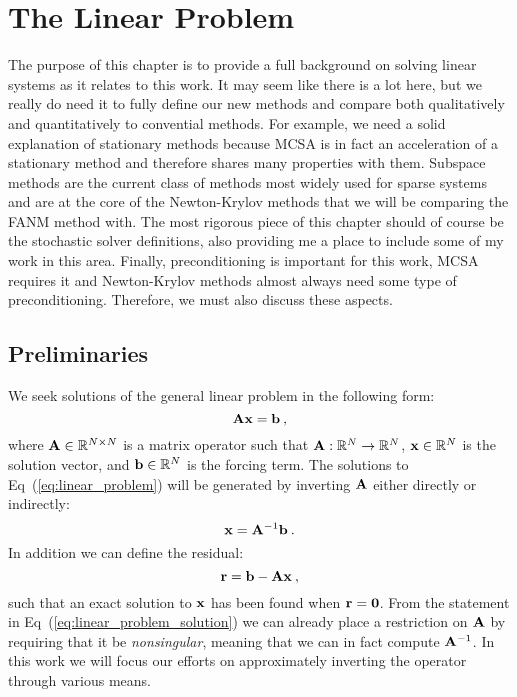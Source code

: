 \chapter{The Linear Problem}
\label{ch:linear_problem}

The purpose of this chapter is to provide a full background on solving
linear systems as it relates to this work. It may seem like there is a
lot here, but we really do need it to fully define our new methods and
compare both qualitatively and quantitatively to convential
methods. For example, we need a solid explanation of stationary
methods because MCSA is in fact an acceleration of a stationary method
and therefore shares many properties with them. Subspace methods are
the current class of methods most widely used for sparse systems and
are at the core of the Newton-Krylov methods that we will be comparing
the FANM method with. The most rigorous piece of this chapter should
of course be the stochastic solver definitions, also providing me a
place to include some of my work in this area. Finally,
preconditioning is important for this work, MCSA requires it and
Newton-Krylov methods almost always need some type of
preconditioning. Therefore, we must also discuss these aspects.

\section{Preliminaries}
\label{sec:linear_preliminaries}
We seek solutions of the general linear problem in the following form:
\begin{equation}
  \mathbf{A} \mathbf{x} = \mathbf{b}\:,
  \label{eq:linear_problem}
\end{equation}
where $\mathbf{A} \in \mathbb{R}^{N \times N}$ is a matrix operator such
that $\mathbf{A} : \mathbb{R}^{N} \rightarrow \mathbb{R}^{N}$, $\mathbf{x} \in
\mathbb{R}^N$ is the solution vector, and $\mathbf{b} \in \mathbb{R}^N$ is
the forcing term. The solutions to Eq~(\ref{eq:linear_problem}) will
be generated by inverting $\mathbf{A}$ either directly or indirectly:
\begin{equation}
  \mathbf{x} = \mathbf{A}^{-1} \mathbf{b}
  \label{eq:linear_problem_solution}\:.
\end{equation}
In addition we can define the residual:
\begin{equation}
  \mathbf{r} = \mathbf{b} - \mathbf{A}\mathbf{x}\:,
  \label{eq:linear_residual}
\end{equation}
such that an exact solution to $\mathbf{x}$ has been found when
$\mathbf{r}=\mathbf{0}$.  From the statement in
Eq~(\ref{eq:linear_problem_solution}) we can already place a
restriction on $\mathbf{A}$ by requiring that it be \textit{nonsingular},
meaning that we can in fact compute $\mathbf{A}^{-1}$. In this work we
will focus our efforts on approximately inverting the operator through
various means.


